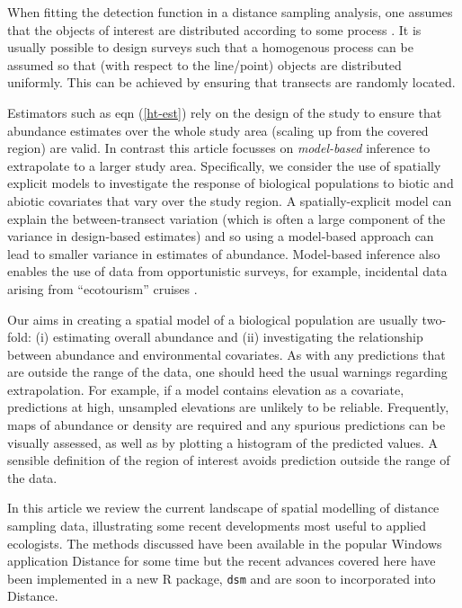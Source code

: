 \documentclass[a4paper,12pt]{article}
\begin{document}
When fitting the detection function in a distance sampling analysis, one assumes that the objects of interest are distributed according to some process \citep[Section 2.1]{Buckland:2001vm}. It is usually possible to design surveys such that a homogenous process can be assumed so that (with respect to the line/point) objects are distributed uniformly. This can be achieved by ensuring that  transects are randomly located.

Estimators such as eqn (\ref{ht-est}) rely on the design of the study to ensure that abundance estimates over the whole study area (scaling up from the covered region) are valid. In contrast this article focusses on \textit{model-based} inference to extrapolate to a larger study area. Specifically, we consider the use of spatially explicit models to investigate the response of biological populations to biotic and abiotic covariates that vary over the study region. A spatially-explicit model can explain the between-transect variation (which is often a large component of the variance in design-based estimates) and so using a model-based approach can lead to smaller variance in estimates of abundance. Model-based inference also enables the use of data from opportunistic surveys, for example, incidental data arising from ``ecotourism'' cruises \citep{Williams:2006tz}. 

Our aims in creating a spatial model of a biological population are usually two-fold: (i) estimating overall abundance and (ii) investigating the relationship between abundance and environmental covariates. As with any predictions that are outside the range of the data, one should heed the usual warnings regarding extrapolation. For example, if a model contains elevation as a covariate, predictions at high, unsampled elevations are unlikely to be reliable. Frequently, maps of abundance or density are required and any spurious predictions can be visually assessed, as well as by plotting a histogram of the predicted values. A sensible definition of the region of interest avoids prediction outside the range of the data.

In this article we review the current landscape of spatial modelling of distance sampling data, illustrating some recent developments most useful to applied ecologists. The methods discussed have been available in the popular Windows application Distance \citep{Thomas:2010cf} for some time but the recent advances covered here have been implemented in a new \textsf{R} package, \texttt{dsm} \citep{dsm-package}  and are soon to incorporated into Distance.
\end{document}
